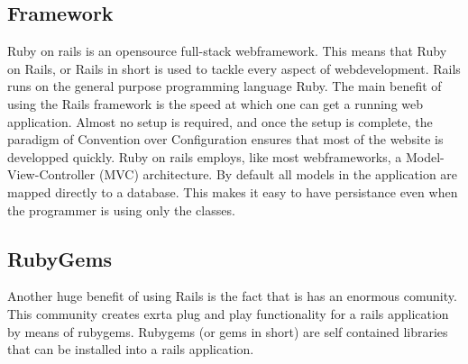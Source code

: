 \subsection{Framework} %
\label{sub:Framework}
Ruby on rails is an opensource full-stack webframework. This means that Ruby on Rails, or Rails in short is used to tackle every aspect of webdevelopment. Rails runs on the general purpose programming language Ruby.
The main benefit of using the Rails framework is the speed at which one can get a running web application. Almost no setup is required, and once the setup is complete, the paradigm of Convention over Configuration ensures that most of the website is developped quickly.
Ruby on rails employs, like most webframeworks, a Model-View-Controller (MVC) architecture. By default all models in the application are mapped directly to a database. This makes it easy to have persistance even when the programmer is using only the classes.
\subsection{RubyGems} %
\label{sub:RubyGems}
Another huge benefit of using Rails is the fact that is has an enormous comunity. This community creates exrta plug and play functionality for a rails application by means of rubygems. Rubygems (or gems in short) are self contained libraries that can be installed into a rails application.
